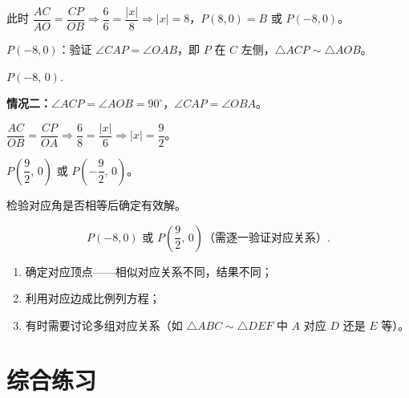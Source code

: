 \documentclass[12pt, a4paper]{ctexart}
\begin{document}
\begin{examplebox}[【例18】相似三角形存在性]
此时 $\dfrac{AC}{AO}=\dfrac{CP}{OB}\Rightarrow\dfrac{6}{6}=\dfrac{|x|}{8}\Rightarrow|x|=8$，$P(8,0)=B$ 或 $P(-8,0)$。

$P(-8,0)$：验证 $\angle CAP=\angle OAB$，即 $P$ 在 $C$ 左侧，$\triangle ACP\sim\triangle AOB$。

$\boxed{P(-8,\,0).}$

\textbf{情况二：}$\angle ACP=\angle AOB=90^\circ$，$\angle CAP=\angle OBA$。

$\dfrac{AC}{OB}=\dfrac{CP}{OA}\Rightarrow\dfrac{6}{8}=\dfrac{|x|}{6}\Rightarrow|x|=\dfrac{9}{2}$。

$P\!\left(\dfrac{9}{2},\,0\right)$ 或 $P\!\left(-\dfrac{9}{2},\,0\right)$。

检验对应角是否相等后确定有效解。

\[\boxed{P(-8,0) \text{ 或 } P\!\left(\frac{9}{2},\,0\right) \text{（需逐一验证对应关系）}.}\]
\end{examplebox}

\begin{tipbox}[相似三角形存在性的关键]
\begin{enumerate}[label=\textbf{(\arabic*)}]
  \item 确定对应顶点——相似对应关系不同，结果不同；
  \item 利用对应边成比例列方程；
  \item 有时需要讨论多组对应关系（如 $\triangle ABC\sim\triangle DEF$ 中 $A$ 对应 $D$ 还是 $E$ 等）。
\end{enumerate}
\end{tipbox}

\newpage

\section*{\textcolor{mainblue}{综合练习}}
\end{document}
